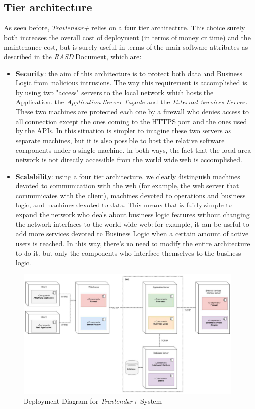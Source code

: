 \subsection{Tier architecture}
As seen before, \emph{Travlendar+} relies on a four tier architecture. This choice surely both increases the overall cost of deployment (in terms of money or time) and the maintenance cost, but is surely useful in terms of the main software attributes as described in the \emph{RASD} Document, which are:
\begin{itemize}
    \item \textbf{Security}: the aim of this architecture is to protect both data and Business Logic from malicious intrusions. The way this requirement is accomplished is by using two "access" servers to the local network which hosts the Application: the \emph{Application Server Façade} and the \emph{External Services Server}. These two machines are protected each one by a firewall who denies access to all connection except the ones coming to the HTTPS port and the ones used by the APIs. In this situation is simpler to imagine these two servers as separate machines, but it is also possible to host the relative software components under a single machine. In both ways, the fact that the local area network is not directly accessible from the world wide web is accomplished.
    
    \item \textbf{Scalability}: using a four tier architecture, we clearly distinguish machines devoted to communication with the web (for example, the web server that communicates with the client), machines devoted to operations and business logic, and machines devoted to data. This means that is fairly simple to expand the network who deals about business logic features without changing the network interfaces to the world wide web: for example, it can be useful to add more services devoted to Business Logic when a certain amount of active users is reached. In this way, there's no need to modify the entire architecture to do it, but only the components who interface themselves to the business logic. 
\end{itemize}
\begin{figure}[H]
    \centering
    \includegraphics[scale=0.9]{Pictures/DeploymentPictures/deploymentDiagram.jpg}
    \caption{Deployment Diagram for \emph{Travlendar+} System}
\end{figure}

